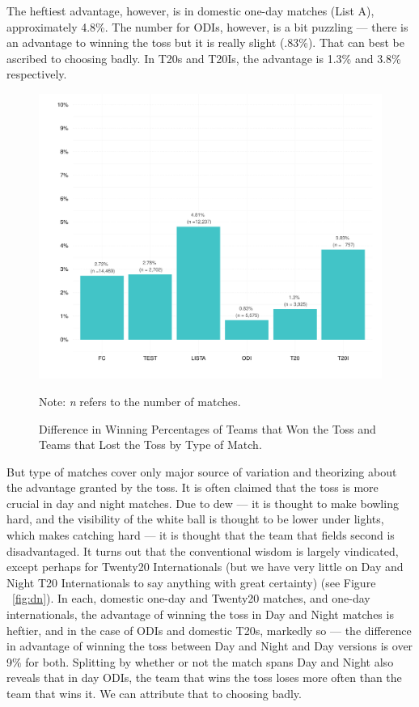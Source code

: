 \documentclass[12pt]{article}
\begin{document}
The heftiest advantage, however, is in domestic one-day matches (List A), approximately 4.8\%. The number for ODIs, however, is a bit puzzling --- there is an advantage to winning the toss but it is really slight (.83\%). That can best be ascribed to choosing badly. In T20s and T20Is, the advantage is 1.3\% and 3.8\% respectively.      

\begin{figure}[htbp]
\caption{Difference in Winning Percentages of Teams that Won the Toss and Teams that Lost the Toss by Type of Match.}
\begin{minipage}{0.85\textwidth}
\centering
\includegraphics[scale=.85]{../figs/winbyType.pdf}
{\footnotesize Note: \emph{n} refers to the number of matches.\par}
\end{minipage}
\label{fig:type}
\end{figure}

But type of matches cover only major source of variation and theorizing about the advantage granted by the toss. It is often claimed that the toss is more crucial in day and night matches. Due to dew --- it is thought to make bowling hard, and the visibility of the white ball is thought to be lower under lights, which makes catching hard --- it is thought that the team that fields second is disadvantaged. It turns out that the conventional wisdom is largely vindicated, except perhaps for Twenty20 Internationals (but we have very little on Day and Night T20 Internationals to say anything with great certainty) (see Figure ~\ref{fig:dn}). In each, domestic one-day and Twenty20 matches, and one-day internationals, the advantage of winning the toss in Day and Night matches is heftier, and in the case of ODIs and domestic T20s, markedly so --- the difference in advantage of winning the toss between Day and Night and Day versions is over 9\% for both. Splitting by whether or not the match spans Day and Night also reveals that in day ODIs, the team that wins the toss loses more often than the team that wins it. We can  attribute that to choosing badly. 
\end{document}
